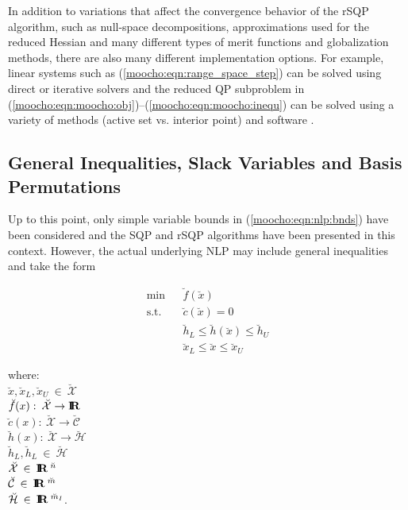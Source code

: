 \documentclass[pdf,12pt,report]{SANDreport}
\begin{document}
In addition to variations that affect the convergence behavior of the
rSQP algorithm, such as null-space decompositions, approximations used
for the reduced Hessian and many different types of merit functions
and globalization methods, there are also many different
implementation options.  For example, linear systems such as
(\ref{moocho:eqn:range_space_step}) can be solved using direct or
iterative solvers and the reduced QP subproblem in
(\ref{moocho:eqn:moocho:obj})--(\ref{moocho:eqn:moocho:inequ}) can be
solved using a variety of methods (active set vs. interior point) and
software {}\cite{ref:schmid_qpkwik_1994}.

%
\subsection{General Inequalities, Slack Variables and Basis Permutations}
\label{moocho:sec:nlp_with_slacks}
%

Up to this point, only simple variable bounds in
(\ref{moocho:eqn:nlp:bnds}) have been considered and the SQP and rSQP
algorithms have been presented in this context.  However, the actual
underlying NLP may include general inequalities and take the form
%
{\bsinglespace
\begin{eqnarray}
\mbox{min}  &  & \breve{f}(\breve{x})                                     \label{moocho:eqn:nlporig:obj} \\
\mbox{s.t.} &  & \breve{c}(\breve{x}) = 0                                 \label{moocho:eqn:nlporig:equ} \\
            &  & \breve{h}_L \leq \breve{h}(\breve{x}) \leq \breve{h}_U   \label{moocho:eqn:nlporig:inequ} \\
            &  & \breve{x}_L \leq \breve{x}            \leq \breve{x}_U   \label{moocho:eqn:nlporig:bnds}
\end{eqnarray}
\begin{tabbing}
\hspace{4ex}where:\hspace{5ex}\= \\
\>	$\breve{x}, \breve{x}_L, \breve{x}_U \:\in\:\breve{\mathcal{X}}$ \\
\>	$\breve{f}(x) : \:\breve{\mathcal{X}} \rightarrow \mbox{\textbf{I}}\hspace{-0.6ex}\mbox{\textbf{R}}$ \\
\>	$\breve{c}(x) : \:\breve{\mathcal{X}} \rightarrow \breve{\mathcal{C}}$ \\
\>	$\breve{h}(x) : \:\breve{\mathcal{X}} \rightarrow \breve{\mathcal{H}}$ \\
\>	$\breve{h}_L, \breve{h}_L \:\in\:\breve{\mathcal{H}}$ \\
\>	$\breve{\mathcal{X}} \:\in\:\mbox{\textbf{I}}\hspace{-0.6ex}\mbox{\textbf{R}}\:^{\breve{n}}$ \\
\>	$\breve{\mathcal{C}} \:\in\:\mbox{\textbf{I}}\hspace{-0.6ex}\mbox{\textbf{R}}\:^{\breve{m}}$ \\
\>	$\breve{\mathcal{H}} \:\in\:\mbox{\textbf{I}}\hspace{-0.6ex}\mbox{\textbf{R}}\:^{\breve{m}_I}$.
\end{tabbing}
\esinglespace}
\end{document}
